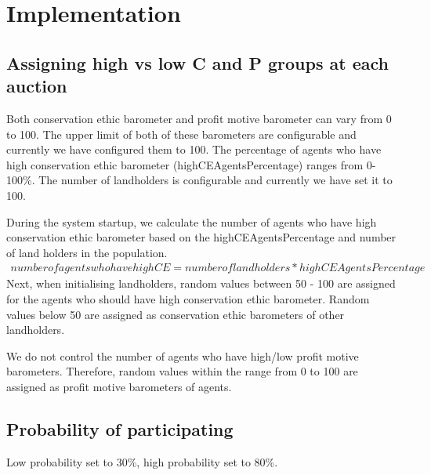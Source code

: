 \documentclass{article} %
\begin{document}
\section{Implementation}
\subsection{Assigning high vs low C and P groups at each auction}
Both conservation ethic barometer and profit motive barometer can vary 
from 0 to 100. The upper limit of both of these barometers are configurable 
and currently we have configured them to 100. The percentage of agents who 
have high conservation ethic barometer (highCEAgentsPercentage) ranges 
from 0-100\%. The number of landholders is configurable and currently we 
have set it to 100. 

During the system startup, we calculate the number of agents who have 
high conservation ethic barometer based on the highCEAgentsPercentage 
and number of land holders in the population.
\begin{equation}\label{xx}
\begin{split}
number of agents who have high CE = number of landholders * highCEAgentsPercentage
\end{split}
\end{equation}
Next, when initialising landholders, random values between 50 - 100 
are assigned for the agents who should have high conservation ethic 
barometer. Random values below 50 are assigned as conservation ethic 
barometers of other landholders. 

We do not control the number of agents who have high/low profit motive 
barometers. Therefore, random values within the range from 0 to 100 are 
assigned as profit motive barometers of agents. 


\subsection{Probability of participating}
Low probability set to 30\%, high probability set to 80\%. 
\end{document}
